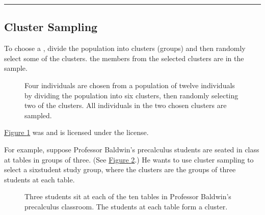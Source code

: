 \documentclass[letterpaper,10pt,english]{jupyterBook}
\begin{document}
\bigskip\hrule\bigskip



\subsection{Cluster Sampling}
\label{\detokenize{Ch1 Sampling and Data/1.3 Sampling Techniques:cluster-sampling}}
\sphinxAtStartPar
To choose a , divide the population into clusters (groups) and then randomly select some of the clusters.  the members from the selected clusters are in the sample.

\begin{figure}[htbp]
\centering
\capstart

\noindent{}
\caption{Four individuals are chosen from a population of twelve individuals by dividing the population into six clusters, then randomly selecting two of the clusters. All individuals in the two chosen clusters are sampled. \sphinxfootnotemark[6]}\label{\detokenize{Ch1 Sampling and Data/1.3 Sampling Techniques:id13}}\end{figure}
%
\begin{footnotetext}[6]\sphinxAtStartFootnote
\hyperref[\detokenize{Ch1 Sampling and Data/1.3 Sampling Techniques:id13}]{Figure \ref{\detokenize{Ch1 Sampling and Data/1.3 Sampling Techniques:id13}}} was  and is licensed under the  license.
%
\end{footnotetext}\ignorespaces 
\sphinxAtStartPar
For example, suppose Professor Baldwin’s precalculus students are seated in class at tables in groups of three. (See \hyperref[\detokenize{Ch1 Sampling and Data/1.3 Sampling Techniques:table-clusters}]{Figure \ref{\detokenize{Ch1 Sampling and Data/1.3 Sampling Techniques:table-clusters}}}.) He wants to use cluster sampling to select a six\sphinxhyphen{}student study group, where the clusters are the groups of three students at each table.

\begin{figure}[htbp]
\centering
\capstart

\noindent{}
\caption{Three students sit at each of the ten tables in Professor Baldwin’s precalculus classroom. The students at each table form a cluster.}\label{\detokenize{Ch1 Sampling and Data/1.3 Sampling Techniques:table-clusters}}\end{figure}
\end{document}
